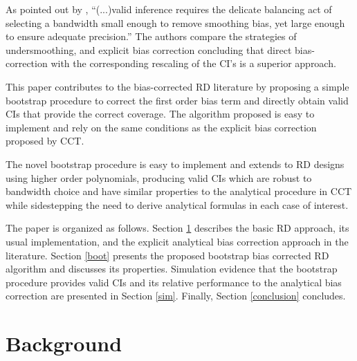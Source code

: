 \documentclass[12pt,fleqn]{article}
\begin{document}
As pointed out by \cite{ccf2016}, ``(...)valid inference
requires the delicate balancing act of selecting a bandwidth small enough
to remove smoothing bias, yet large enough to ensure adequate precision.''
The authors compare the strategies of undersmoothing, and explicit bias 
correction concluding that direct bias-correction with the corresponding 
rescaling of the CI's is a superior approach.

This paper contributes to the bias-corrected RD literature by proposing a simple
bootstrap procedure to correct the first order bias term and directly obtain 
valid CIs that provide the correct coverage. The algorithm proposed is easy to
implement and rely on the same conditions as the explicit bias correction
proposed by CCT.

The novel bootstrap procedure is easy to implement and extends to RD designs 
using higher order polynomials, producing valid CIs which are robust to 
bandwidth choice and have similar properties to the analytical procedure in 
CCT while sidestepping the need to derive analytical formulas in each case of interest.

The paper is organized as follows. Section \ref{background} describes the basic
RD approach, its usual implementation, and the explicit analytical bias 
correction approach in the literature. Section \ref{boot} presents the proposed 
bootstrap bias corrected RD algorithm and discusses its properties. Simulation
evidence that the bootstrap procedure provides valid CIs and its relative 
performance to the analytical bias correction are presented in Section \ref{sim}.
Finally, Section \ref{conclusion} concludes.

\section{Background}\label{background}
\end{document}
